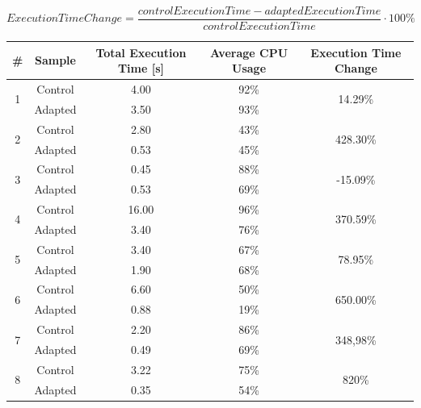 \documentclass[12pt,a4paper]{article}
\begin{document}
\begin{equation} \label{eq:random}
Execution Time Change=\frac{controlExecutionTime-adaptedExecutionTime}{controlExecutionTime} \cdot 100\%
\end{equation}

{\renewcommand{\arraystretch}{1.2}
\begin{table}[ht]
\begin{center}
\begin{tabular}{c c | c | c | c}
                 \textbf{\#} & \textbf{Sample} &  \textbf{Total Execution Time [s]} & \textbf{Average CPU Usage} & \textbf{Execution Time Change} \\ \hline 
 \multirow{2}{*}{1} & Control&     4.00          &     92\%   & \multirow{2}{*}{14.29\%} \\ 	  
                    & Adapted&     3.50          &     93\%   & \\ \hline
 \multirow{2}{*}{2} & Control&     2.80          &     43\%   & \multirow{2}{*}{428.30\%}\\ 	  
                    & Adapted&     0.53          &     45\%   & \\ \hline 
 \multirow{2}{*}{3} & Control&     0.45          &     88\%   & \multirow{2}{*}{-15.09\%}\\ 	  
                    & Adapted&     0.53          &     69\%   & \\ \hline 
 \multirow{2}{*}{4} & Control&     16.00         &     96\%   & \multirow{2}{*}{370.59\%}\\ 	  
                    & Adapted&     3.40          &     76\%   & \\ \hline 
 \multirow{2}{*}{5} & Control&     3.40          &     67\%   & \multirow{2}{*}{78.95\%}\\ 	  
                    & Adapted&     1.90          &     68\%   & \\ \hline
 \multirow{2}{*}{6} & Control&     6.60          &     50\%   & \multirow{2}{*}{650.00\%}\\ 	  
                    & Adapted&     0.88          &     19\%   & \\ \hline
 \multirow{2}{*}{7} & Control&     2.20          &     86\%   & \multirow{2}{*}{348,98\%}\\	  
                    & Adapted&     0.49          &     69\%   & \\ \hline 
 \multirow{2}{*}{8} & Control&     3.22          &     75\%   & \multirow{2}{*}{820\%}\\  
                    & Adapted&     0.35          &     54\%   & \\ \hline 

\end{tabular}
\end{center}
\end{table}}
\end{document}
